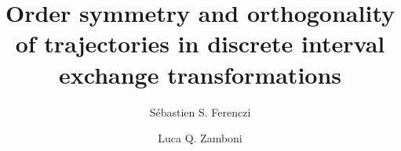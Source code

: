 \documentclass[12pt,a4paper]{amsart}
\begin{document}
\title[Order symmetry \& orthogonality of trajectories in discrete iets]{Order symmetry and orthogonality of trajectories in discrete interval exchange transformations}


\author[S.S. Ferenczi]{S\'ebastien S. Ferenczi}
\address{Aix Marseille Universit\'e, CNRS, Centrale Marseille, Institut de Math\' ematiques de Marseille, I2M - UMR 7373\\13453 Marseille, France.}





\author[L.Q. Zamboni]{Luca Q. Zamboni}
\address{Institut Camille Jordan\\
Universit\'e Claude Bernard Lyon 1\\
43 boulevard du 11 novembre 1918\\
F69622 Villeurbanne Cedex
(France)}



\date{}


\end{document}
